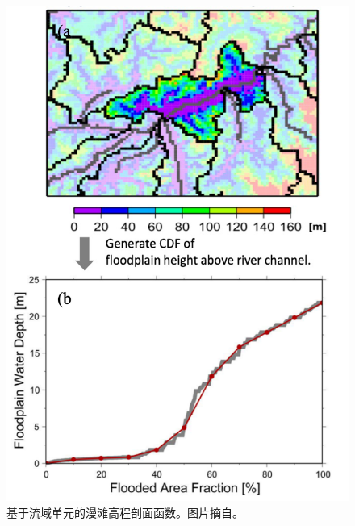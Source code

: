 {
\begin{figure}[]
\centering
\includegraphics{Figures/陆地表面的水分循环/基于流域单元的漫滩高程剖面函数.png}
\caption{基于流域单元的漫滩高程剖面函数。图片摘自\citet{yamazaki2013improving}。  }
\label{fig:基于流域单元的漫滩高程剖面函数}
\end{figure}
}


